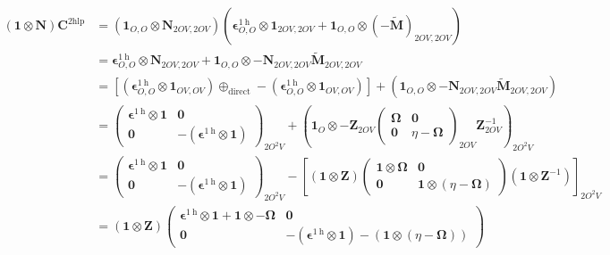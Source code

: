\begin{align}
 \left( \bm{1} \otimes \bm{N} \right)\bm{C}^{2\mathrm{hlp}} &= \left( \bm{1}_{O,O} \otimes \bm{N}_{2OV,2OV} \right) \left( \bm{\epsilon}^{1 \mathrm{~h}}_{O,O} \otimes \bm{1}_{2OV,2OV} + \bm{1}_{O,O} \otimes (-\bm{\tilde{M}})_{2OV,2OV} \right)\\
&= \bm{\epsilon}^{1 \mathrm{~h}}_{O,O} \otimes \bm{N}_{2OV,2OV} + \bm{1}_{O,O} \otimes -\bm{N}_{2OV,2OV} \bm{\tilde{M}}_{2OV,2OV}\\
&= \left[\left( \bm{\epsilon}^{1 \mathrm{~h}}_{O,O} \otimes \bm{1}_{OV,OV} \right) \oplus_{\text{direct}} -\left( \bm{\epsilon}^{1 \mathrm{~h}}_{O,O} \otimes \bm{1}_{OV,OV} \right)\right] + \left( \bm{1}_{O,O} \otimes -\bm{N}_{2OV,2OV} \bm{\tilde{M}}_{2OV,2OV} \right)\\
&= \begin{pmatrix} \bm{\epsilon}^{1 \mathrm{~h}} \otimes \bm{1} & \bm{0} \\ \bm{0} & -\left(\bm{\epsilon}^{1 \mathrm{~h}} \otimes \bm{1}\right) \end{pmatrix}_{2O^2V}
 + \left( \bm{1}_{O} \otimes -\bm{Z}_{2OV} \begin{pmatrix}
\bm{\Omega} & \bm{0} \\ \bm{0} & \eta - \bm{\Omega}\end{pmatrix}_{2OV}
\bm{Z}^{-1}_{2OV}\right)_{2O^2V}\\
&= \begin{pmatrix} \bm{\epsilon}^{1 \mathrm{~h}} \otimes \bm{1} & \bm{0} \\ \bm{0} & -\left(\bm{\epsilon}^{1 \mathrm{~h}} \otimes \bm{1}\right) \end{pmatrix}_{2O^2V}
 - \left[ \left( \bm{1} \otimes\bm{Z} \right) \begin{pmatrix}
\bm{1} \otimes \bm{\Omega} & \bm{0} \\ \bm{0} &\bm{1} \otimes( \eta - \bm{\Omega})\end{pmatrix}
\left( \bm{1} \otimes \bm{Z}^{-1}\right) \right]_{2O^2V}\\
&= \left( \bm{1} \otimes\bm{Z} \right) \begin{pmatrix} \bm{\epsilon}^{1 \mathrm{~h}} \otimes \bm{1} + \bm{1} \otimes -\bm{\Omega} & \bm{0} \\ \bm{0} & -\left(\bm{\epsilon}^{1 \mathrm{~h}} \otimes \bm{1}\right) -(\bm{1} \otimes( \eta - \bm{\Omega})) \end{pmatrix}

\end{align}
